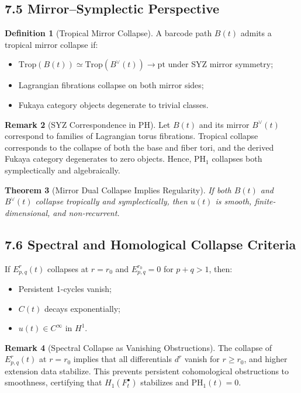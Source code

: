 \documentclass[11pt]{article}
\newtheorem{theorem}{Theorem}[section]
\theoremstyle{definition}
\newtheorem{definition}[theorem]{Definition}
\newtheorem{remark}[theorem]{Remark}
\begin{document}
\subsection*{7.5 Mirror--Symplectic Perspective}

\begin{definition}[Tropical Mirror Collapse]
A barcode path $B(t)$ admits a tropical mirror collapse if:
\begin{itemize}
  \item $\mathrm{Trop}(B(t)) \simeq \mathrm{Trop}(B^\vee(t)) \to \mathrm{pt}$ under SYZ mirror symmetry;
  \item Lagrangian fibrations collapse on both mirror sides;
  \item Fukaya category objects degenerate to trivial classes.
\end{itemize}
\end{definition}

\begin{remark}[SYZ Correspondence in PH]
Let $B(t)$ and its mirror $B^\vee(t)$ correspond to families of Lagrangian torus fibrations. Tropical collapse corresponds to the collapse of both the base and fiber tori, and the derived Fukaya category degenerates to zero objects. Hence, $\mathrm{PH}_1$ collapses both symplectically and algebraically.
\end{remark}

\begin{theorem}[Mirror Dual Collapse Implies Regularity]
If both $B(t)$ and $B^\vee(t)$ collapse tropically and symplectically, then $u(t)$ is smooth, finite-dimensional, and non-recurrent.
\end{theorem}

\subsection*{7.6 Spectral and Homological Collapse Criteria}

If $E^r_{p,q}(t)$ collapses at $r = r_0$ and $E^{r_0}_{p,q}=0$ for $p+q>1$, then:
\begin{itemize}
  \item Persistent 1-cycles vanish;
  \item $C(t)$ decays exponentially;
  \item $u(t) \in C^\infty$ in $H^1$.
\end{itemize}

\begin{remark}[Spectral Collapse as Vanishing Obstructions]
The collapse of $E^r_{p,q}(t)$ at $r = r_0$ implies that all differentials $d^r$ vanish for $r \ge r_0$, and higher extension data stabilize. This prevents persistent cohomological obstructions to smoothness, certifying that $H_1(F^\bullet_t)$ stabilizes and $\mathrm{PH}_1(t) = 0$.
\end{remark}
\end{document}
